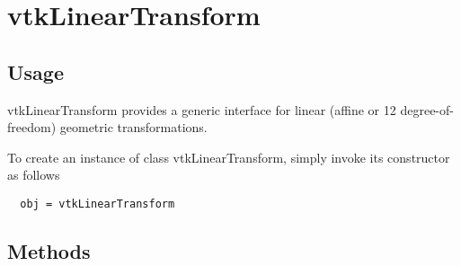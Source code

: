 \section{vtkLinearTransform}

\subsection{Usage}

 vtkLinearTransform provides a generic interface for linear 
 (affine or 12 degree-of-freedom) geometric transformations. 

To create an instance of class vtkLinearTransform, simply
invoke its constructor as follows
\begin{verbatim}
  obj = vtkLinearTransform
\end{verbatim}
\subsection{Methods}

